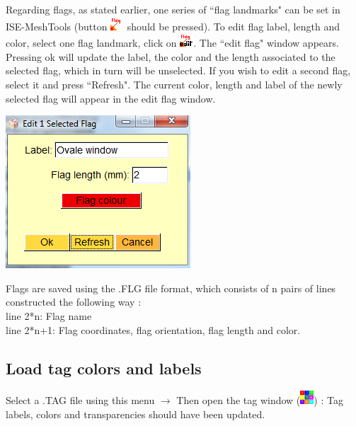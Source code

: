 \noindent
\begin{minipage}{0.55\textwidth}
Regarding flags, as stated earlier, one series of ``flag landmarks" can be set in ISE-MeshTools (button \includegraphics[scale=0.7]{images/pixmap/Flag01.png} should
be pressed). To edit flag label, length and color, select one
flag landmark, click on \includegraphics[scale=0.7]{images/pixmap/Flag02.png}. The ``edit flag" window appears.
Pressing ok will update the label, the color and the
length associated to the selected flag, which in turn will be
unselected. If you wish to edit a second flag, select it and press ``Refresh". The current color, length
and label of the newly selected flag will appear in the edit flag window.
\end{minipage}  
 \begin{minipage}{0.45\textwidth}\centering
  \includegraphics[scale=0.5]{images/Flags/Edit1flag.png}
 \end{minipage} 
\noindent
Flags are saved using the .FLG file format, which consists of n pairs of lines constructed the following way :\\
line 2*n: Flag name\\
line 2*n+1: Flag coordinates, flag orientation, flag length and color.

\subsection{Load tag colors and labels}
Select a .TAG file using this menu $\rightarrow$ Then open the tag window (\includegraphics[scale=0.7]{images/pixmap/Show_Tag_Window2.png}) : Tag labels, colors and
transparencies should have been updated.
